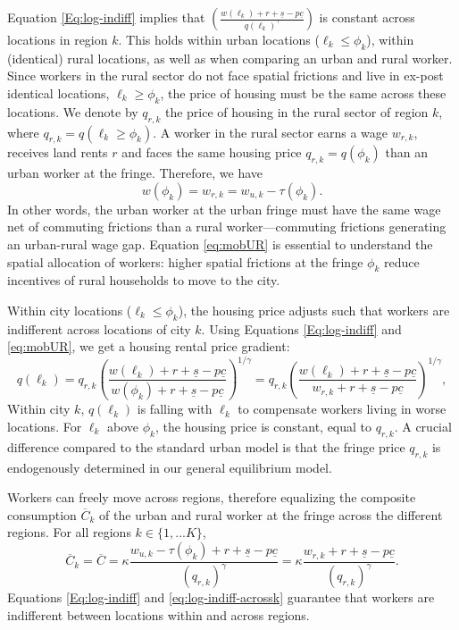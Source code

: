 \documentclass[20250130-paper.tex]{subfiles}
\begin{document}
Equation \eqref{Eq:log-indiff} implies that $\left( \frac{w(\ell_k)+r+ \underline{s}-p\underline{c}}{q(\ell_k)^{\gamma}}\right)$ is constant across locations in region $k$. This holds within urban locations ($\ell_k \leq \phi_k$), within (identical) rural locations, as well as when comparing an urban and rural worker. Since workers in the rural sector do not face spatial frictions and live in ex-post identical locations, $\ell_k \geq \phi_k$, the price of housing must be the same across these locations. We denote by $q_{r,k}$ the price of housing in the rural sector of region $k$, where $q_{r,k}=q(\ell_k \geq \phi_k)$. A worker in the rural sector earns a wage $w_{r,k}$, receives land rents $r$ and faces the same housing price $q_{r,k}=q(\phi_k)$ than an urban worker at the fringe. Therefore, we have
\begin{equation}
w(\phi_k)=w_{r,k}=w_{u,k} -\tau(\phi_k). \label{eq:mobUR}
\end{equation}
In other words, the urban worker at the urban fringe must have the same wage net of commuting frictions than a rural worker---commuting frictions generating an urban-rural wage gap. Equation \eqref{eq:mobUR} is essential to understand the spatial allocation of workers: higher spatial frictions at the fringe $\phi_k$ reduce incentives of rural households to move to the city. 


Within city locations ($\ell_k \leq \phi_k$), the housing price adjusts such that workers are indifferent across locations of city $k$. Using Equations \eqref{Eq:log-indiff} and \eqref{eq:mobUR}, we get a housing rental price gradient:
\begin{equation}
q(\ell_k)=q_{r,k} \left( \frac{w(\ell_k)+r+ \underline{s}-p\underline{c}}{w(\phi_k)+r+ \underline{s}-p\underline{c}}\right)
^{1/\gamma}=q_{r,k} \left( \frac{w(\ell_k)+r+ \underline{s}-p\underline{c}}{w_{r,k}+r+ \underline{s}-p\underline{c}}\right)
^{1/\gamma}, \label{eq:q_d}
\end{equation}
Within city $k$, $q(\ell_k)$ is falling with $\ell_k$ to compensate workers living in worse locations. For $\ell_k$ above $\phi_k$, the housing price is constant, equal to $q_{r,k}$. A crucial difference compared to the standard urban model is that the fringe price $q_{r,k}$ is endogenously determined in our general equilibrium model.

Workers can freely move across regions, therefore equalizing the composite consumption $\overline{C}_k$ of the urban and rural worker at the fringe across the different regions. For all regions $k \in \{1,...K\}$,
\begin{equation}
\overline{C}_k=\overline{C}=\kappa\frac{w_{u,k}-\tau(\phi_k) + r + \underline{s} -p\underline{c}}{(q_{r,k})^{\gamma}}=\kappa\frac{w_{r,k}+r+ \underline{s}-p\underline{c}}{(q_{r,k})^{\gamma}}.
\label{eq:log-indiff-acrossk}
\end{equation}
Equations \eqref{Eq:log-indiff} and  \eqref{eq:log-indiff-acrossk} guarantee that workers are indifferent between locations within and across regions.
\end{document}
